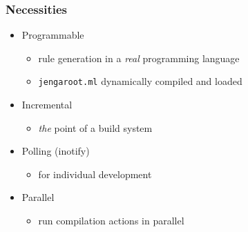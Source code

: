 \documentclass{beamer}
\begin{document}

\begin{frame}[fragile]
\frametitle{Necessities}
\begin{itemize}
\item Programmable
\begin{itemize}
\item rule generation in a {\em real} programming language
\item {\tt jengaroot.ml} dynamically compiled and loaded
\end{itemize}
\item Incremental
\begin{itemize}
\item {\em the} point of a build system
\end{itemize}
\item Polling (inotify)
\begin{itemize}
\item for individual development
\end{itemize}
\item Parallel
\begin{itemize}
\item run compilation actions in parallel
\end{itemize}
\end{itemize}
\end{frame}





\end{document}
